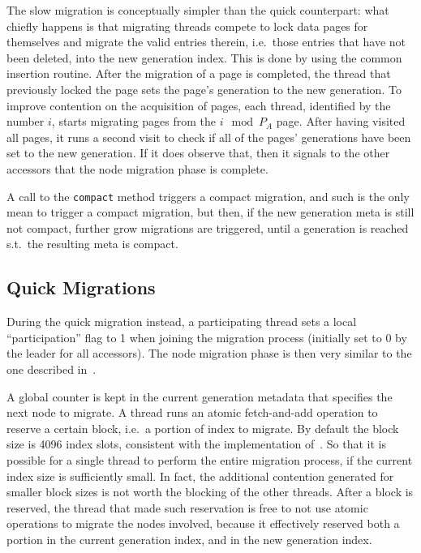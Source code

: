 The slow migration is conceptually simpler than the quick counterpart: what chiefly happens is that migrating threads compete to lock data pages for themselves and migrate the valid entries therein, i.e.\ those entries that have not been deleted, into the new generation index.
This is done by using the common insertion routine.
After the migration of a page is completed, the thread that previously locked the page sets the page's generation to the new generation.
To improve contention on the acquisition of pages, each thread, identified by the number $i$, starts migrating pages from the $i \mod P_A$ page.
After having visited all pages, it runs a second visit to check if all of the pages' generations have been set to the new generation.
If it does observe that, then it signals to the other accessors that the node migration phase is complete.

A call to the \texttt{compact} method triggers a compact migration, and such is the only mean to trigger a compact migration, but then, if the new generation meta is still not compact, further grow migrations are triggered, until a generation is reached s.t.\ the resulting meta is compact.

\subsection{Quick Migrations}\label{subsec:quick-migrations}
During the quick migration instead, a participating thread sets a local ``participation'' flag to 1 when joining the migration process (initially set to 0 by the leader for all accessors).
The node migration phase is then very similar to the one described in~\cite[\S5.3.1]{maier}.

A global counter is kept in the current generation metadata that specifies the next node to migrate.
A thread runs an atomic fetch-and-add operation to reserve a certain block, i.e.\ a portion of index to migrate.
By default the block size is 4096 index slots, consistent with the implementation of~\cite{maier}.
So that it is possible for a single thread to perform the entire migration process, if the current index size is sufficiently small.
In fact, the additional contention generated for smaller block sizes is not worth the blocking of the other threads.
After a block is reserved, the thread that made such reservation is free to not use atomic operations to migrate the nodes involved, because it effectively reserved both a portion in the current generation index, and in the new generation index.

